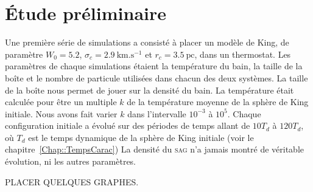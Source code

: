 \section{Étude préliminaire}


	Une première série de simulations a consisté à placer un modèle de King, de paramètre $W_0 = 5.2$, $\sigma_c = 2.9\
	\mathrm{km}.\mathrm{s}^{-1}$ et $r_c = 3.5\ \mathrm{pc}$, dans un thermostat. Les paramètres de chaque simulations étaient la
	température du bain, la taille de la boîte et le nombre de particule utilisées dans chacun des deux systèmes. La taille de la boîte
	nous permet de jouer sur la densité du bain. La température était calculée pour être un multiple $k$ de la température moyenne de la
	sphère de King initiale. Nous avons fait varier $k$ dans l'intervalle $10^{-3}$ à $10^5$. Chaque configuration initiale a évolué
	sur des périodes de temps allant de $10T_d$ à $120T_d$, où $T_d$ est le temps dynamique de la sphère de King initiale (voir le
	chapitre~\ref{Chap::TempsCarac})
	La densité du \textsc{sag} n'a jamais montré de véritable évolution, ni les autres paramètres.

	PLACER QUELQUES GRAPHES.



